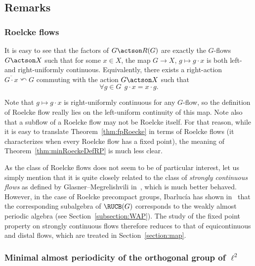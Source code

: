 \subsection{Remarks}
\label{subsection:Remarks}

\subsubsection{Roelcke flows}

It is easy to see that the factors of $G\actson R(G)$ are exactly the $G$-flows $G\actson X$ such that for some $x\in X$, the map $G\rightarrow X$, $g\mapsto g\cdot x$ is both left- and right-uniformly continuous. Equivalently, there exists a right-action $\overline{G\cdot x}\curvearrowleft G$ commuting with the action $G\actson X$ such that
\[
\forall g\in G\ \ g\cdot x = x \cdot g.
\]

Note that $g\mapsto g\cdot x$ is right-uniformly continuous for any $G$-flow, so the definition of Roelcke flow really lies on the left-uniform continuity of this map. Note also that a subflow of a Roelcke flow may not be Roelcke itself. For that reason, while it is easy to translate Theorem~\ref{thm:fpRoecke} in terms of Roelcke flows (it characterizes when every Roelcke flow has a fixed point), the meaning of Theorem~\ref{thm:minRoeckeDefRP} is much less clear.

As the class of Roelcke flows does not seem to be of particular interest, let us simply mention that it is quite closely related to the class of \emph{strongly continuous flows} as defined by Glasner--Megrelishvili in~\cite{GlM2}, which is much better behaved. However, in the case of Roelcke precompact groups, Ibarluc\'ia has shown in~\cite{I1} that the corresponding subalgebra of $\RUCB(G)$ corresponds to the weakly almost periodic algebra (see Section~\ref{subsection:WAP}). The study of the fixed point property on strongly continuous flows therefore reduces to that of equicontinuous and distal flows, which are treated in Section~\ref{section:map}.


\subsubsection{Minimal almost periodicity of the orthogonal group of \texorpdfstring{$\ell^{2}$}{l2}}
\label{subsubsection:mapell2}

